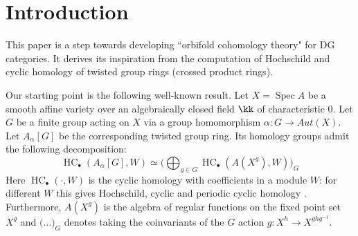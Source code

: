 \documentclass[12pt,a4paper,reqno]{amsart}
\DeclareMathOperator{\spec}{Spec}
\DeclareMathOperator{\hochcx}{{HC}}
\begin{document}
\newcommand\bicat\mathbf            %

\theoremstyle{definition}
\newtheorem{defn}{Definition}[section]
\newtheorem*{defn*}{Definition}
\newtheorem{exmpl}[defn]{Example}
\newtheorem*{exmpl*}{Example}
\newtheorem{exrc}[defn]{Exercise}
\newtheorem*{exrc*}{Exercise}
\newtheorem*{chk*}{Check}
\newtheorem*{remarks*}{Remarks}
\theoremstyle{plain}
\newtheorem{theorem}{Theorem}[section]
\newtheorem*{theorem*}{Theorem}
\newtheorem{conj}[defn]{Conjecture}
\newtheorem*{conj*}{Conjecture}
\newtheorem{question}[defn]{Question}
\newtheorem*{question*}{Question}
\newtheorem{prps}[defn]{Proposition}
\newtheorem*{prps*}{Proposition}
\newtheorem{cor}[defn]{Corollary}
\newtheorem*{cor*}{Corollary}
\newtheorem{lemma}[defn]{Lemma}
\newtheorem*{claim*}{Claim}
\newtheorem{Specialthm}{Theorem}
\renewcommand\theSpecialthm{\Alph{Specialthm}}
\renewcommand{\textfraction}{0.001}
\renewcommand{\topfraction}{0.999}
\renewcommand{\bottomfraction}{0.999}
\renewcommand{\floatpagefraction}{0.9}
\setlength{\textfloatsep}{5pt}
\setlength{\floatsep}{0pt}
\setlength{\abovecaptionskip}{2pt}
\setlength{\belowcaptionskip}{2pt}

\section{Introduction}
\label{section-introduction}

This paper is a step towards developing ``orbifold cohomology theory"
for DG categories. It derives its inspiration from the computation of
Hochschild and cyclic homology of twisted group rings 
(crossed product rings).  

Our starting point is the following well-known result. Let 
$X = \spec A$ be a smooth affine variety over an algebraically
closed field $\kk$ of characteristic $0$. Let $G$ be a finite
group acting on $X$ via a group homomorphism $\alpha: G \to Aut(X)$. 
Let $A_\alpha[G]$ be the corresponding twisted group ring. 
Its homology groups admit the following decomposition:
\begin{equation}
\label{eqn-orbifold-mixed-complex-decomposition-affine-case}
\hochcx_\bullet(A_\alpha[G], W) \simeq 
\big(\bigoplus_{g \in G}  \hochcx_\bullet (A(X^g), W)\big)_G
\end{equation}
Here $\hochcx_\bullet(\cdot, W)$ is the cyclic homology with coefficients
in a module $W$: for different $W$ this gives Hochschild, cyclic and periodic
cyclic homology 
\cite[\S4]{GetzlerJones-TheCyclicHomologyOfCrossedProductAlgebras}. 
Furthermore, $A(X^g)$ is the 
algebra of regular functions on the fixed point set $X^g$ and 
$\big(\ldots\big)_G$ denotes taking the coinvariants of the 
$G$ action $g\colon X^h \rightarrow X^{ghg^{-1}}$. 
\end{document}
